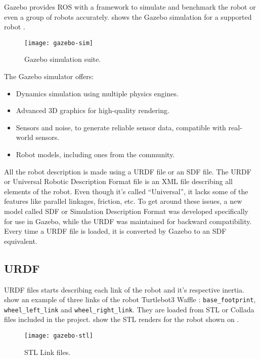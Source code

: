 Gazebo provides ROS with a framework to simulate and benchmark the robot or even a group of robots accurately.  shows the Gazebo simulation for a supported robot \cite{koenig2004design}.

\begin{figure}[!ht]
\centering
\texttt{[image: gazebo-sim]}
\caption{Gazebo simulation suite.}
\label{fig:gazebo-sim}
\end{figure}

The Gazebo simulator offers:

\begin{itemize}
\item Dynamics simulation using multiple physics engines.
\item Advanced 3D graphics for high-quality rendering.
\item Sensors and noise, to generate reliable sensor data, compatible with real-world sensors.
\item Robot models, including ones from the community.
\end{itemize}

All the robot description is made using a URDF file or an SDF file. The URDF or Universal Robotic Description Format file is an XML file describing all elements of the robot. Even though it's called ``Universal'', it lacks some of the features like parallel linkages, friction, etc. To get around these issues, a new model called SDF or  Simulation Description Format was developed specifically for use in Gazebo, while the URDF was maintained for backward compatibility. Every time a URDF file is loaded, it is converted by Gazebo to an SDF equivalent.

\subsection{URDF}

URDF files starts describing each link of the robot and it's respective inertia.  show an example of three links of the robot Turtlebot3 Waffle \cite{turtlebot3}: \texttt{base\_footprint}, \texttt{wheel\_left\_link} and \texttt{wheel\_right\_link}. They are loaded from STL or Collada files included in the project.  show the STL renders for the robot shown on .

\begin{figure}[!ht]
\centering
\texttt{[image: gazebo-stl]}
\caption{STL Link files.}
\label{fig:gazebo-stl}
\end{figure}

